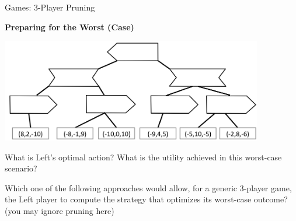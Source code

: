 \begin{problem}[18]{Games: 3-Player Pruning}
\begin{question}[4]{\bf Preparing for the Worst (Case)}
\begin{center}
 {
    \includegraphics[width=4.5in]{figures/alpha_beta_gamma/abg_q}
}
\end{center}

\begin{subquestion}[2]  What is Left's optimal action? What is the utility achieved in this worst-case scenario?


\end{subquestion}

\begin{subquestion}[2]  Which one of the following approaches would allow,
  for a generic 3-player game, the Left player to compute the strategy
  that optimizes its worst-case outcome? (you may ignore pruning here)

\begin{itemize}[label=]
\OneEii
\end{itemize}

\end{subquestion}
\end{question}
\end{problem}